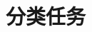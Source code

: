 \setcounter{chapter}{5}

\hypertarget{ux5206ux7c7bux4efbux52a1}{%
\chapter{分类任务}\label{ux5206ux7c7bux4efbux52a1}}
